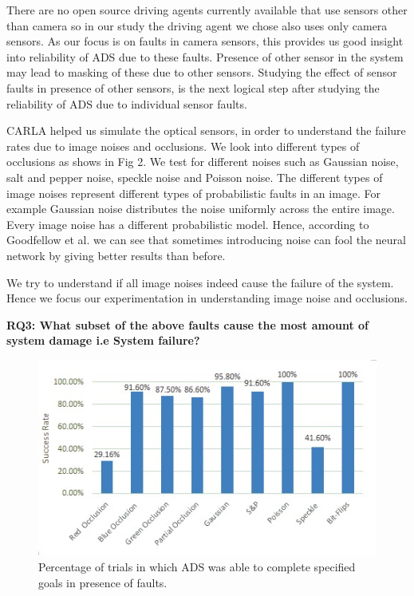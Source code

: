 There are no open source driving agents currently available that use sensors other than camera so in our study the driving agent we chose also uses only camera sensors. As our focus is on faults in camera sensors, this provides us good insight into reliability of ADS due to these faults. Presence of other sensor in the system may lead to masking of these due to other sensors. Studying the effect of sensor faults in presence of other sensors, is the next logical step after studying the reliability of ADS due to individual sensor faults.  

CARLA helped us simulate the optical sensors, in order to understand the failure rates due to image noises and occlusions. We look into different types of occlusions as shows in Fig 2. We test for different noises such as Gaussian noise, salt and pepper noise, speckle noise and Poisson noise. The different types of image noises represent different types of probabilistic faults in an image. For example Gaussian noise distributes the noise uniformly across the entire image. Every image noise has a different probabilistic model. Hence, according to Goodfellow et al.\cite{Goodfellow} we can see that sometimes introducing noise can fool the neural network by giving better results than before. 

We try to understand if all image noises indeed cause the failure of the system. Hence we focus our experimentation in understanding image noise and occlusions.

\textbf{RQ3: What subset of the above faults cause the most amount of system damage i.e System failure?}

\begin{figure}
	\vspace{-0.5em}
	\centering
	\includegraphics[scale=0.7]{success_rate}
	\vspace{-0.5em}
	\caption{Percentage of trials in which ADS was able to complete specified goals in presence of faults.}
	\label{fig:success_rate}
	\vspace{-1.5em}
\end{figure}

